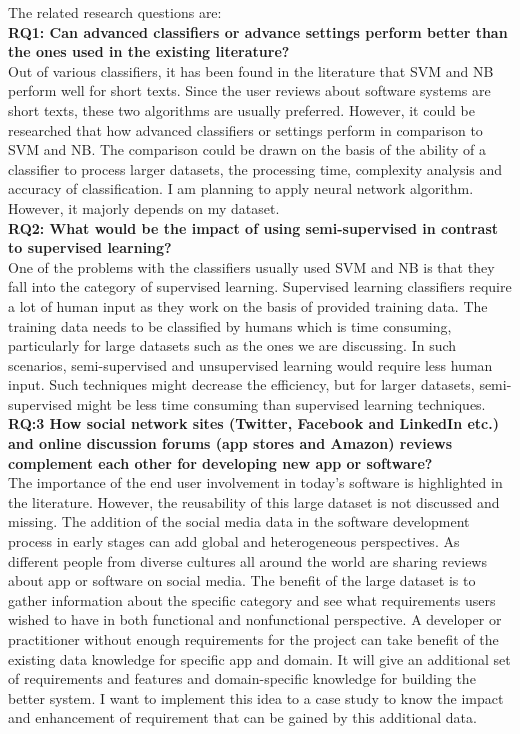 The related research questions are:\\

\textbf{RQ1: Can advanced classifiers or advance settings perform better than the ones used in the existing
literature?}\\
Out of various classifiers, it has been found in the literature that SVM and NB perform well for
short texts. Since the user reviews about software systems are short texts, these two algorithms
are usually preferred. However, it could be researched that how advanced classifiers or settings perform
in comparison to SVM and NB. The comparison could be drawn on the basis of the ability of a
classifier to process larger datasets, the processing time, complexity analysis and accuracy of
classification. I am planning to apply neural network algorithm. However, it majorly depends on my dataset.\\

\textbf{RQ2: What would be the impact of using semi-supervised in
contrast to supervised learning?}\\
One of the problems with the classifiers usually used SVM and NB is that they fall into the
category of supervised learning. Supervised learning classifiers require a lot of human input as
they work on the basis of provided training data. The training data needs to be classified by
humans which is time consuming, particularly for large datasets such as the ones we are
discussing. In such scenarios, semi-supervised and unsupervised learning would require
less human input. Such techniques might decrease the efficiency, but for larger datasets, semi-supervised
might be less time consuming than supervised learning
techniques.\\

\textbf{RQ:3 How social network sites (Twitter, Facebook and LinkedIn etc.) and online discussion
forums (app stores and Amazon) reviews complement each other for developing new
app or software?}\\
The importance of the end user involvement in today’s software is highlighted
in the literature. However, the reusability of this large dataset is not discussed and missing. The
addition of the social media data in the software development process in early stages can add
global and heterogeneous perspectives. As different people from diverse cultures all around the world are sharing reviews about app or software on social media. The benefit of the large dataset is to gather information
about the specific category and see what requirements users wished to have in both functional and
nonfunctional perspective. A developer or practitioner without enough requirements for the project
 can take benefit of the existing data knowledge for
 specific app and domain. It will give an additional set of requirements and features and
domain-specific knowledge for building the better system. I want to implement this idea to a case
study to know the impact and enhancement of requirement that can be gained by this additional
data.

